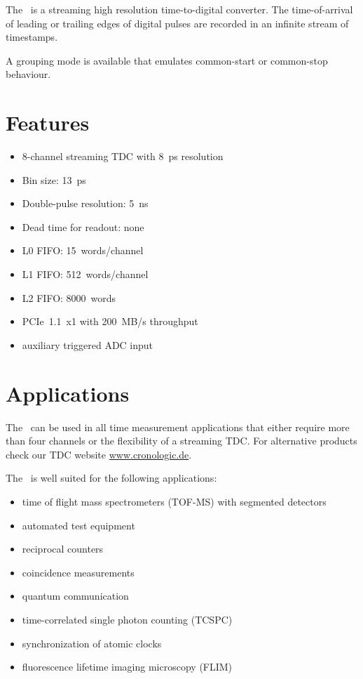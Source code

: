 The \deviceName\ is a streaming high resolution time-to-digital converter. 
The time-of-arrival of leading or trailing edges of digital pulses are recorded in an infinite stream of timestamps.

A grouping mode is available that emulates common-start or common-stop behaviour. 

\section{Features}
	\begin{itemize}
		\item 8-channel streaming TDC with 8~ps resolution
		\item Bin size: 13~ps
		\item Double-pulse resolution: 5~ns
		\item Dead time for readout: none
		\item L0 FIFO: 15~words/channel
		\item L1 FIFO: 512~words/channel
		\item L2 FIFO: 8000~words
		\item PCIe~1.1~x1 with 200~MB/s throughput
		\item auxiliary triggered ADC input
	\end{itemize} 
\section{Applications}
The \deviceName\ can be used in all time measurement applications that either require more than four channels or the flexibility of a streaming TDC. 
For alternative products check our TDC website \href{https://www.cronologic.de/products/products-overview#tdcdata}{www.cronologic.de}.

The \deviceName\ is well suited for the following applications:
\begin{itemize}
	\item time of flight mass spectrometers (TOF-MS) with segmented detectors
	\item automated test equipment
	\item reciprocal counters
	\item coincidence measurements
	\item quantum communication
	\item time-correlated single photon counting (TCSPC)
	\item synchronization of atomic clocks
	\item fluorescence lifetime imaging microscopy (FLIM)
\end{itemize} 